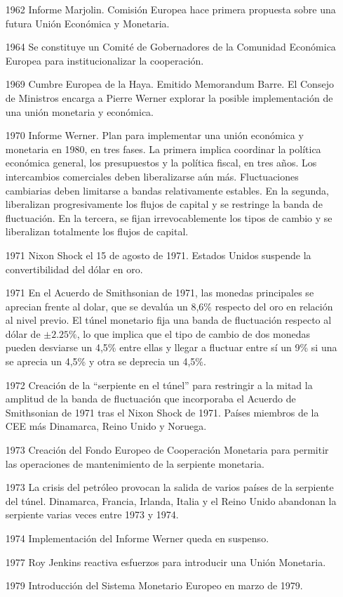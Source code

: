 \documentclass{nuevotema}
\begin{document}
\begin{itemize}
	\item[1962] Informe Marjolin. Comisión Europea hace primera propuesta sobre una futura Unión Económica y Monetaria.
	\item[1964] Se constituye un Comité de Gobernadores de la Comunidad Económica Europea para institucionalizar la cooperación.
	\item[1969] Cumbre Europea de la Haya. Emitido Memorandum Barre. El Consejo de Ministros encarga a Pierre Werner explorar la posible implementación de una unión monetaria y económica.
	\item[1970] Informe Werner. Plan para implementar una unión económica y monetaria en 1980, en tres fases. La primera implica coordinar la política económica general, los presupuestos y la política fiscal, en tres años. Los intercambios comerciales deben liberalizarse aún más. Fluctuaciones cambiarias deben limitarse a bandas relativamente estables. En la segunda, liberalizan progresivamente los flujos de capital y se restringe la banda de fluctuación. En la tercera, se fijan irrevocablemente los tipos de cambio y se liberalizan totalmente los flujos de capital.
	\item[1971] Nixon Shock el 15 de agosto de 1971. Estados Unidos suspende la convertibilidad del dólar en oro. 
	\item[1971] En el Acuerdo de Smithsonian de 1971, las monedas principales se aprecian frente al dolar, que se devalúa un 8,6\% respecto del oro en relación al nivel previo. El túnel monetario fija una banda de fluctuación respecto al dólar de $\pm 2.25\%$, lo que implica que el tipo de cambio de dos monedas pueden desviarse un 4,5\% entre ellas y llegar a fluctuar entre sí un 9\% si una se aprecia un 4,5\% y otra se deprecia un 4,5\%. 
	\item[1972] Creación de la ``serpiente en el túnel'' para restringir a la mitad la amplitud de la banda de fluctuación que incorporaba el Acuerdo de Smithsonian de 1971 tras el Nixon Shock de 1971. Países miembros de la CEE más Dinamarca, Reino Unido y Noruega. 
	\item[1973] Creación del Fondo Europeo de Cooperación Monetaria para permitir las operaciones de mantenimiento de la serpiente monetaria.
	\item[1973] La crisis del petróleo provocan la salida de varios países de la serpiente del túnel. Dinamarca, Francia, Irlanda, Italia y el Reino Unido abandonan la serpiente varias veces entre 1973 y 1974.
	\item[1974] Implementación del Informe Werner queda en suspenso.
	\item[1977] Roy Jenkins reactiva esfuerzos para introducir una Unión Monetaria.
	\item[1979] Introducción del Sistema Monetario Europeo en marzo de 1979.
\end{itemize}
\end{document}
